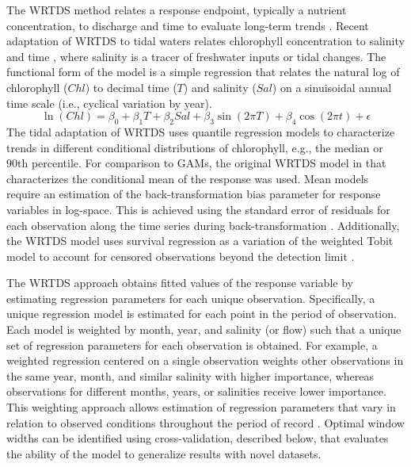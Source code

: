 \documentclass[letterpaper,12pt,oneside]{article}\usepackage[]{graphicx}\usepackage[]{color}
\begin{document}
The \ac{WRTDS} method relates a response endpoint, typically a nutrient concentration, to discharge and time to evaluate long-term trends \citep{Hirsch10,Hirsch14}. Recent adaptation of \ac{WRTDS} to tidal waters relates chlorophyll concentration to salinity and time \citep{Beck15}, where salinity is a tracer of freshwater inputs or tidal changes.  The functional form of the model is a simple regression that relates the natural log of chlorophyll ($Chl$) to decimal time ($T$) and salinity ($Sal$) on a sinuisoidal annual time scale (i.e., cyclical variation by year). 
\begin{equation} \label{eqn:funform}
\ln\left(Chl\right) = \beta_0 + \beta_1 T + \beta_2 Sal + \beta_3 \sin\left(2\pi T\right) + \beta_4 \cos\left(2\pi t\right) + \epsilon
\end{equation}
The tidal adaptation of \ac{WRTDS} uses quantile regression models \citep{Cade03} to characterize trends in different conditional distributions of chlorophyll, e.g., the median or 90th percentile. For comparison to \acp{GAM}, the original \ac{WRTDS} model in \citet{Hirsch10} that characterizes the conditional mean of the response was used.  Mean models require an estimation of the back-transformation bias parameter for response variables in log-space. This is achieved using the standard error of residuals for each observation along the time series during back-transformation \citep{Hirsch10}.  Additionally, the \ac{WRTDS} model uses survival regression as a variation of the weighted Tobit model \citep{Tobin58} to account for censored observations beyond the detection limit \citep{Hirsch14}.

The \ac{WRTDS} approach obtains fitted values of the response variable by estimating regression parameters for each unique observation. Specifically, a unique regression model is estimated for each point in the period of observation. Each model is weighted by month, year, and salinity (or flow) such that a unique set of regression parameters for each observation is obtained. For example, a weighted regression centered on a single observation weights other observations in the same year, month, and similar salinity with higher importance, whereas observations for different months, years, or salinities receive lower importance. This weighting approach allows estimation of regression parameters that vary in relation to observed conditions throughout the period of record \citep{Hirsch10}. Optimal window widths can be identified using cross-validation, described below, that evaluates the ability of the model to generalize results with novel datasets.
\end{document}
